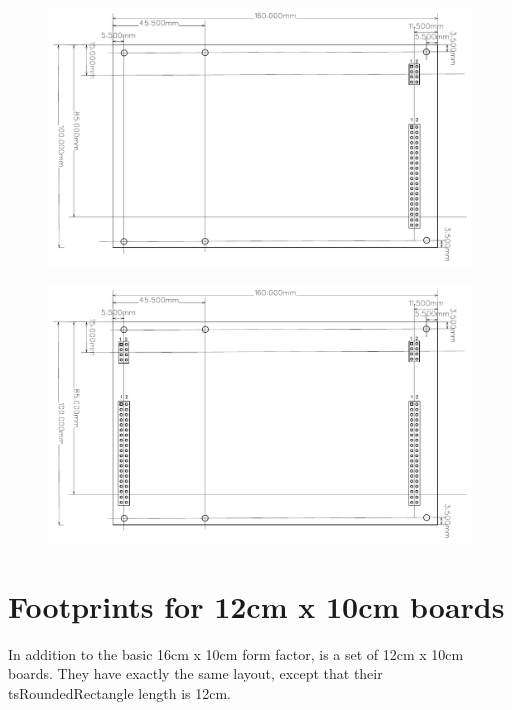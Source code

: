 \begin{figure}[ht]
    \centering
    \includegraphics[page=1, width=\textwidth]{./figures/LCS-FP-EXT-R-40-10X16.pdf}
\end{figure}

\FloatBarrier

\begin{figure}[ht]
    \centering
    \includegraphics[page=1, width=\textwidth]{./figures/LCS-FP-EXT-L-R-40-10X16.pdf}
\end{figure}

\FloatBarrier

\section{Footprints for 12cm x 10cm boards}

In addition to the basic 16cm x 10cm form factor, is a set of 12cm x 10cm boards. They have exactly the same layout, except that their tsRoundedRectangle length is 12cm. 

